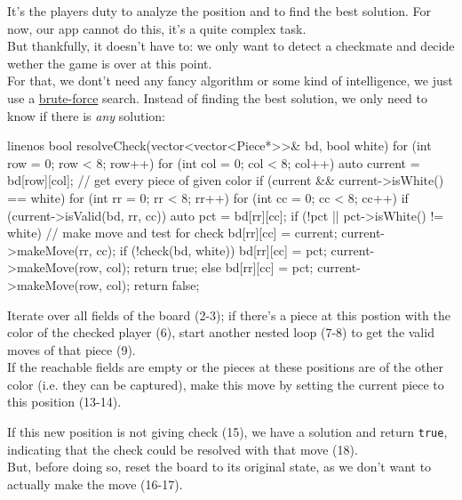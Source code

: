 It's the players duty to analyze the position and to find the best solution.
For now, our app cannot do this, it's a quite complex task.\\
But thankfully, it doesn't have to: we only want to detect a checkmate and decide wether the game
is over at this point.\\
For that, we dont't need any fancy algorithm or some kind of intelligence, we just use a
\href{https://en.wikipedia.org/wiki/Brute-force_search}{brute-force} search.
Instead of finding the best solution, we only need to know if there is \emph{any} solution:

\begin{cpp*}{linenos}
bool resolveCheck(vector<vector<Piece*>>& bd, bool white) {
  for (int row = 0; row < 8; row++) {
    for (int col = 0; col < 8; col++) {
      auto current = bd[row][col];
      // get every piece of given color
      if (current && current->isWhite() == white) {
        for (int rr = 0; rr < 8; rr++) {
          for (int cc = 0; cc < 8; cc++) {
            if (current->isValid(bd, rr, cc)) {
              auto pct = bd[rr][cc];
              if (!pct || pct->isWhite() != white) {
                // make move and test for check
                bd[rr][cc] = current;
                current->makeMove(rr, cc);
                if (!check(bd, white)) {
                  bd[rr][cc] = pct;
                  current->makeMove(row, col);
                  return true;
                } else {
                  bd[rr][cc] = pct;
                  current->makeMove(row, col);
                }
              }
            }
          }
        }
      }
    }
  }
  return false;
}
\end{cpp*}

Iterate over all fields of the board (2-3); if there's a piece at this postion with the color of the
checked player (6), start another nested loop (7-8) to get the valid moves of that piece (9).\\
If the reachable fields are empty or the pieces at these positions are of the other color
(i.e. they can be captured), make this move by setting the current piece to this position (13-14).

If this new position is not giving check (15), we have a solution and return \texttt{true},
indicating that the check could be resolved with that move (18).\\
But, before doing so, reset the board to its original state, as we don't want to actually make
the move (16-17).

